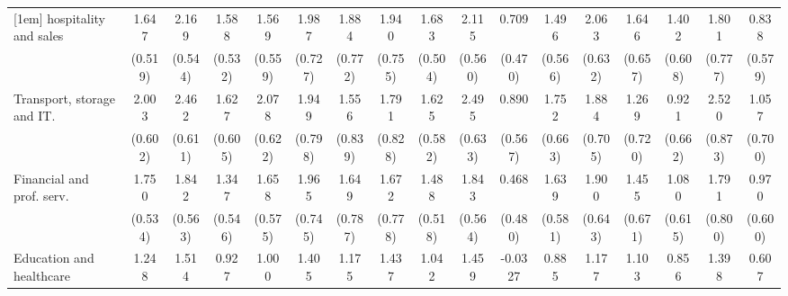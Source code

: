 {\begin{tabular}{l*{16}{c}}
[1em]
hospitality and sales&       1.647\sym{**} &       2.169\sym{***}&       1.588\sym{**} &       1.569\sym{**} &       1.987\sym{**} &       1.884\sym{*}  &       1.940\sym{*}  &       1.683\sym{***}&       2.115\sym{***}&       0.709         &       1.496\sym{**} &       2.063\sym{**} &       1.646\sym{*}  &       1.402\sym{*}  &       1.801\sym{*}  &       0.838         \\
                    &     (0.519)         &     (0.544)         &     (0.532)         &     (0.559)         &     (0.727)         &     (0.772)         &     (0.755)         &     (0.504)         &     (0.560)         &     (0.470)         &     (0.566)         &     (0.632)         &     (0.657)         &     (0.608)         &     (0.777)         &     (0.579)         \\
[1em]
Transport, storage and IT.&       2.003\sym{***}&       2.462\sym{***}&       1.627\sym{**} &       2.078\sym{***}&       1.949\sym{*}  &       1.556         &       1.791\sym{*}  &       1.625\sym{**} &       2.495\sym{***}&       0.890         &       1.752\sym{**} &       1.884\sym{**} &       1.269         &       0.921         &       2.520\sym{**} &       1.057         \\
                    &     (0.602)         &     (0.611)         &     (0.605)         &     (0.622)         &     (0.798)         &     (0.839)         &     (0.828)         &     (0.582)         &     (0.633)         &     (0.567)         &     (0.663)         &     (0.705)         &     (0.720)         &     (0.662)         &     (0.873)         &     (0.700)         \\
[1em]
Financial and prof. serv.&       1.750\sym{**} &       1.842\sym{**} &       1.347\sym{*}  &       1.658\sym{**} &       1.965\sym{**} &       1.649\sym{*}  &       1.672\sym{*}  &       1.488\sym{**} &       1.843\sym{**} &       0.468         &       1.639\sym{**} &       1.900\sym{**} &       1.455\sym{*}  &       1.080         &       1.791\sym{*}  &       0.970         \\
                    &     (0.534)         &     (0.563)         &     (0.546)         &     (0.575)         &     (0.745)         &     (0.787)         &     (0.778)         &     (0.518)         &     (0.564)         &     (0.480)         &     (0.581)         &     (0.643)         &     (0.671)         &     (0.615)         &     (0.800)         &     (0.600)         \\
[1em]
Education and healthcare&       1.248\sym{*}  &       1.514\sym{**} &       0.927         &       1.000         &       1.405         &       1.175         &       1.437         &       1.042\sym{*}  &       1.459\sym{*}  &     -0.0327         &       0.885         &       1.177         &       1.103         &       0.856         &       1.398         &       0.607         \\

\end{tabular}}

